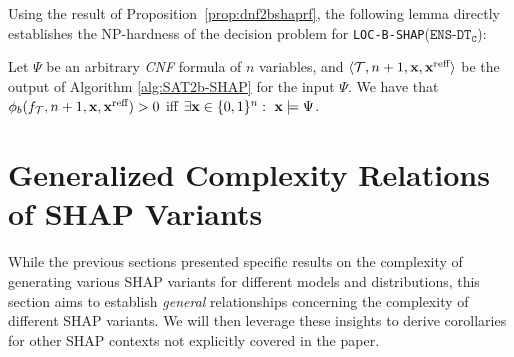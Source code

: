 Using the result of Proposition~\ref{prop:dnf2bshaprf}, the following lemma directly establishes the NP-hardness of the decision problem for \texttt{LOC-B-SHAP}($\texttt{ENS-DT}_{\texttt{C}}$):

\begin{lemma} \label{lemma:sat2bshap}
    Let $\Psi$ be an arbitrary \emph{CNF} formula of $n$ variables, and  $\langle\mathcal{T},n+1,\textbf{x},\textbf{x}^{\text{reff}}\rangle$ be the output of Algorithm \ref{alg:SAT2b-SHAP} for the input $\Psi$. We have that 
    $\phi_{b}(f_{\mathcal{T}}, n+1, \textbf{x}, \textbf{x}^{\text{reff}}) > 0$ iff $\exists \textbf{x} \in \{0,1\}^{n}: ~ \textbf{x} \models \Psi$. 
\end{lemma}


\section{Generalized Complexity Relations of SHAP Variants} \label{sec:generalized}



While the previous sections presented specific results on the complexity of generating various SHAP variants for different models and distributions, this section aims to establish \emph{general} relationships concerning the complexity of different SHAP variants. We will then leverage these insights to derive corollaries for other SHAP contexts not explicitly covered in the paper.


